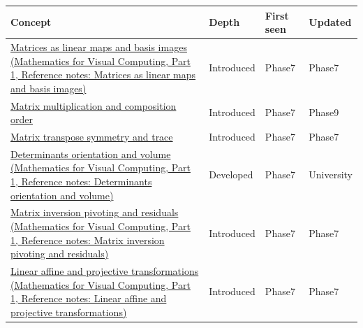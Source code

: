 {\def\LTcaptype{none} %
\begin{longtable}[]{@{}
  >{\raggedright\arraybackslash}p{}
  >{\raggedright\arraybackslash}p{}
  >{\raggedright\arraybackslash}p{}
  >{\raggedright\arraybackslash}p{}@{}}
\toprule\noalign{}
\begin{minipage}[b]{\linewidth}\raggedright
Concept
\end{minipage} & \begin{minipage}[b]{\linewidth}\raggedright
Depth
\end{minipage} & \begin{minipage}[b]{\linewidth}\raggedright
First seen
\end{minipage} & \begin{minipage}[b]{\linewidth}\raggedright
Updated
\end{minipage} \\
\midrule\noalign{}
\endhead
\bottomrule\noalign{}
\endlastfoot
\href{../02-Mathematics-for-Visual-Computing-P01/main.pdf\#nameddest=appendix-bd39c3bf5d64}{Matrices as linear maps and basis images (Mathematics for Visual Computing, Part 1, Reference notes: Matrices as linear maps and basis images)} & Introduced & Phase7 & Phase7 \\
\hyperref[appendix-ab31ef447dbf]{Matrix multiplication and composition order} & Introduced & Phase7 & Phase9 \\
\hyperref[appendix-175ca5ff874d]{Matrix transpose symmetry and trace} & Introduced & Phase7 & Phase7 \\
\href{../02-Mathematics-for-Visual-Computing-P01/main.pdf\#nameddest=appendix-da478be01d02}{Determinants orientation and volume (Mathematics for Visual Computing, Part 1, Reference notes: Determinants orientation and volume)} & Developed & Phase7 & University \\
\href{../02-Mathematics-for-Visual-Computing-P01/main.pdf\#nameddest=appendix-48d2e66378ab}{Matrix inversion pivoting and residuals (Mathematics for Visual Computing, Part 1, Reference notes: Matrix inversion pivoting and residuals)} & Introduced & Phase7 & Phase7 \\
\href{../02-Mathematics-for-Visual-Computing-P01/main.pdf\#nameddest=appendix-0bf0ca73f735}{Linear affine and projective transformations (Mathematics for Visual Computing, Part 1, Reference notes: Linear affine and projective transformations)} & Introduced & Phase7 & Phase7 \\

\end{longtable}}
